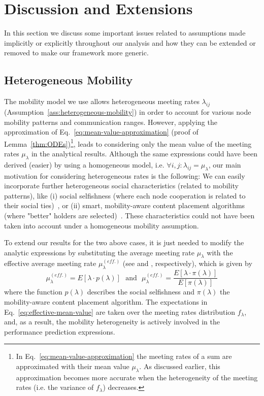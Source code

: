 \documentclass[10pt,conference,letterpaper]{IEEEtran}
\newcommand{\eq}[1]{Eq.~\eqref{#1}}
\begin{document}
\section{Discussion and Extensions}\label{sec:discussion}
In this section we discuss some important issues related to assumptions made implicitly or explicitly throughout our analysis and how they can be extended or removed to make our framework more generic.

\subsection{Heterogeneous Mobility}
The mobility model we use allows heterogeneous meeting rates $\lambda_{ij}$ (Assumption~\ref{ass:heterogeneous-mobility}) in order to account for various node mobility patterns and communication ranges. However, applying the approximation of \eq{eq:mean-value-approximation} (proof of Lemma~\ref{thm:ODEs})\footnote{In \eq{eq:mean-value-approximation} the meeting rates of a sum are approximated with their mean value $\mu_{\lambda}$. As discussed earlier, this approximation becomes more accurate when the heterogeneity of the meeting rates (i.e. the variance of $f_{\lambda}$) decreases.}, leads to considering only the mean value of the meeting rates $\mu_{\lambda}$ in the analytical results. Although the same expressions could have been derived (easier) by using a homogeneous model, i.e. $\forall i,j:\lambda_{ij} = \mu_{\lambda}$, our main motivation for considering heterogeneous rates is the following: We can easily incorporate further heterogeneous social characteristics (related to mobility patterns), like (i) social selfishness (where each node cooperation is related to their social ties)~\cite{pavlos-social-selfishness}, or (ii) smart, mobility-aware content placement algorithms (where "better" holders are selected)~\cite{pavlos-not-all-content}. These characteristics could not have been taken into account under a homogeneous mobility assumption. 

To extend our results for the two above cases, it is just needed to modify the analytic expressions by substituting the average meeting rate $\mu_{\lambda}$ with the effective average meeting rate $\mu_{\lambda}^{(eff.)}$ (see \cite[Lemmas~3.1 and~3.2]{pavlos-social-selfishness} and \cite[Result~4]{pavlos-not-all-content}, respectively), which is given by
\begin{equation}\label{eq:effective-mean-value}
 \mu_{\lambda}^{(eff.)} = E[\lambda\cdot p(\lambda)]~~~\text{and}~~~\mu_{\lambda}^{(eff.)} = \frac{E[\lambda\cdot \pi(\lambda)]}{E[\pi(\lambda)]}
\end{equation}
where the function $p(\lambda)$ describes the social selfishness and $\pi(\lambda)$ the mobility-aware content placement algorithm. The expectations in \eq{eq:effective-mean-value} are taken over the meeting rates distribution $f_{\lambda}$, and, as a result, the mobility heterogeneity is actively involved in the performance prediction expressions.
\end{document}
